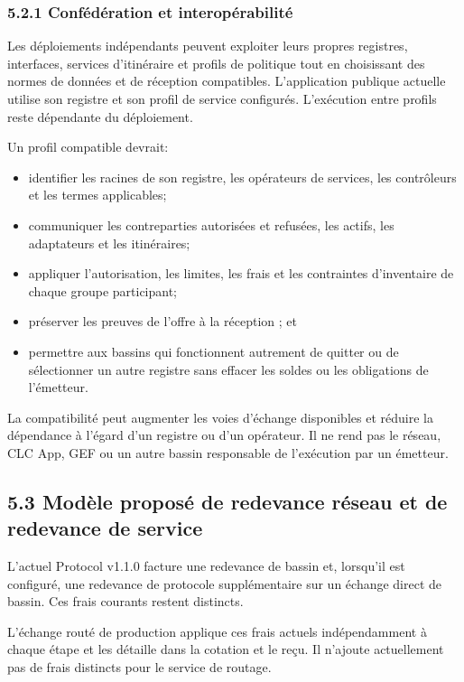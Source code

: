 \documentclass[11pt]{article}
\begin{document}
\subsubsection*{5.2.1 Confédération et interopérabilité}

Les déploiements indépendants peuvent exploiter leurs propres registres, interfaces, services d'itinéraire et profils de politique tout en choisissant des normes de données et de réception compatibles. L'application publique actuelle utilise son registre et son profil de service configurés. L'exécution entre profils reste dépendante du déploiement.

Un profil compatible devrait:

\begin{itemize}[leftmargin=*]
\item identifier les racines de son registre, les opérateurs de services, les contrôleurs et les termes applicables;
\item communiquer les contreparties autorisées et refusées, les actifs, les adaptateurs et les itinéraires;
\item appliquer l'autorisation, les limites, les frais et les contraintes d'inventaire de chaque groupe participant;
\item préserver les preuves de l'offre à la réception ; et
\item permettre aux bassins qui fonctionnent autrement de quitter ou de sélectionner un autre registre sans effacer les soldes ou les obligations de l'émetteur.
\end{itemize}
La compatibilité peut augmenter les voies d'échange disponibles et réduire la dépendance à l'égard d'un registre ou d'un opérateur. Il ne rend pas le réseau, CLC App, GEF ou un autre bassin responsable de l'exécution par un émetteur.

\subsection*{5.3 Modèle proposé de redevance réseau et de redevance de service}

L'actuel Protocol v1.1.0 facture une redevance de bassin et, lorsqu'il est configuré, une redevance de protocole supplémentaire sur un échange direct de bassin. Ces frais courants restent distincts.

L'échange routé de production applique ces frais actuels indépendamment à chaque étape et les détaille dans la cotation et le reçu. Il n'ajoute actuellement pas de frais distincts pour le service de routage.
\end{document}
